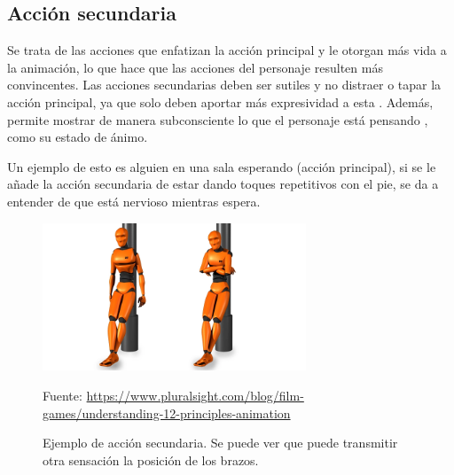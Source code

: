 \documentclass{article}
\begin{document}
\subsection{Acción secundaria}


Se trata de las acciones que enfatizan la acción principal y le otorgan más vida a la animación, lo que hace que las acciones del personaje resulten más convincentes. Las acciones secundarias deben ser sutiles y no distraer o tapar la acción principal, ya que solo deben aportar más expresividad a esta \cite{plural}. Además, permite mostrar de manera subconsciente lo que el personaje está pensando \cite{idearocket}, como su estado de ánimo.

\bigskip


Un ejemplo de esto es alguien en una sala esperando (acción principal), si se le añade la acción secundaria de estar dando toques repetitivos con el pie, se da a entender de que está nervioso mientras espera.

\begin{figure}[H]
    \centering
    \includegraphics[width=0.7\textwidth]{imagenes/secondary-action.png}
    \caption{Ejemplo de acción secundaria. Se puede ver que puede transmitir otra sensación la posición de los brazos.}
    \vspace{10pt}
    \footnotesize{Fuente: \url{https://www.pluralsight.com/blog/film-games/understanding-12-principles-animation}}
\end{figure}
\end{document}
